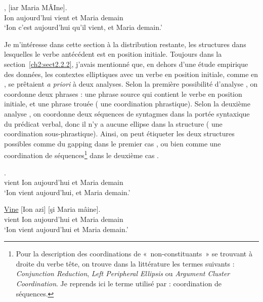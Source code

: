 \ex {}
,  [iar  Maria MÂIne]. \label{ch2:ex278b}\\
Ion  aujourd’hui  vient  et  Maria  demain\\
\glt ‘Ion c’est aujourd’hui qu’il vient, et Maria demain.’
\z
\z

Je m’intéresse dans cette section à la distribution restante, {\cad} les structures dans lesquelles le verbe antécédent est en position initiale. Toujours dans la section~\ref{ch2:sect2.2.2}, j’avais mentionné que, en dehors d’une étude empirique des données, les contextes elliptiques avec un verbe en position initiale, comme en , se prêtaient \textit{a priori} à deux analyses. Selon la première possibilité d’analyse , on coordonne deux phrases : une phrase source qui contient le verbe en position initiale, et une phrase trouée ({\cad} une coordination phrastique). Selon la deuxième analyse , on coordonne deux séquences de syntagmes dans la portée syntaxique du prédicat verbal, donc il n’y a aucune ellipse dans la structure ({\cad} une coordination sous-phrastique). Ainsi, on peut étiqueter les deux structures possibles comme du gapping dans le premier cas , ou bien comme une coordination de séquences\footnote{Pour la description des coordinations de «~non-constituants~» se trouvant à droite du verbe tête, on trouve dans la littérature les termes suivants : \textit{Conjunction Reduction}, \textit{Left Peripheral Ellipsis} ou \textit{Argument Cluster Coordination}. Je reprends ici le terme utilisé par \citet{Mouret2007,Mouret2008} : coordination de séquences.} dans le deuxième cas .

\ea \label{ch2:ex279}
\ea {}
. \label{ch2:ex279a}\\
vient  Ion  aujourd’hui  et  Maria  demain\\
\glt ‘Ion vient aujourd’hui, et Maria demain.’

\ex 
\gll \uline{Vine} [Ion azi] [şi Maria mâine]. \label{ch2:ex279b}\\
vient  Ion  aujourd’hui  et  Maria  demain\\
\glt ‘Ion vient aujourd’hui et Maria demain.’
\z
\z

